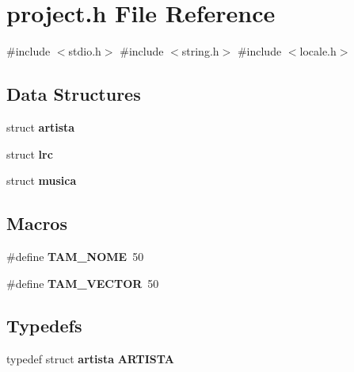 \section{project.\+h File Reference}
\label{project_8h}
{\ttfamily \#include $<$stdio.\+h$>$}\newline
{\ttfamily \#include $<$string.\+h$>$}\newline
{\ttfamily \#include $<$locale.\+h$>$}\newline
\subsection*{Data Structures}
\begin{DoxyCompactItemize}
\item 
struct \textbf{ artista}
\item 
struct \textbf{ lrc}
\item 
struct \textbf{ musica}
\end{DoxyCompactItemize}
\subsection*{Macros}
\begin{DoxyCompactItemize}
\item 
\#define \textbf{ T\+A\+M\+\_\+\+N\+O\+ME}~50
\item 
\#define \textbf{ T\+A\+M\+\_\+\+V\+E\+C\+T\+OR}~50
\end{DoxyCompactItemize}
\subsection*{Typedefs}
\begin{DoxyCompactItemize}
\item 
typedef struct \textbf{ artista} \textbf{ A\+R\+T\+I\+S\+TA}
\end{DoxyCompactItemize}
